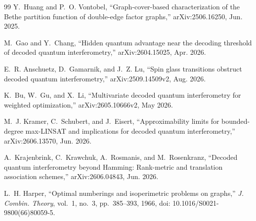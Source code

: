 \documentclass[journal]{IEEEtran}
\theoremstyle{definition}
\theoremstyle{remark}
\begin{document}
\begin{thebibliography}{99}
Y.~Huang and P.~O. Vontobel, ``Graph-cover-based characterization of the
Bethe partition function of double-edge factor graphs,'' arXiv:2506.16250,
Jun. 2025.

M.~Gao and Y.~Chang, ``Hidden quantum advantage near the decoding threshold
of decoded quantum interferometry,'' arXiv:2604.15025, Apr. 2026.

E.~R. Anschuetz, D.~Gamarnik, and J.~Z. Lu, ``Spin glass transitions obstruct
decoded quantum interferometry,'' arXiv:2509.14509v2, Aug. 2026.

K.~Bu, W.~Gu, and X.~Li, ``Multivariate decoded quantum interferometry for
weighted optimization,'' arXiv:2605.10666v2, May 2026.

M.~J. Kramer, C.~Schubert, and J.~Eisert, ``Approximability limits for
bounded-degree max-LINSAT and implications for decoded quantum
interferometry,'' arXiv:2606.13570, Jun. 2026.

A.~Krajenbrink, C.~Krawchuk, A.~Rosmanis, and M.~Rosenkranz, ``Decoded
quantum interferometry beyond Hamming: Rank-metric and translation association
schemes,'' arXiv:2606.04843, Jun. 2026.

L.~H. Harper, ``Optimal numberings and isoperimetric problems on graphs,''
\emph{J. Combin. Theory}, vol.~1, no.~3, pp.~385--393, 1966,
doi: 10.1016/S0021-9800(66)80059-5.

\end{thebibliography}
\end{document}
